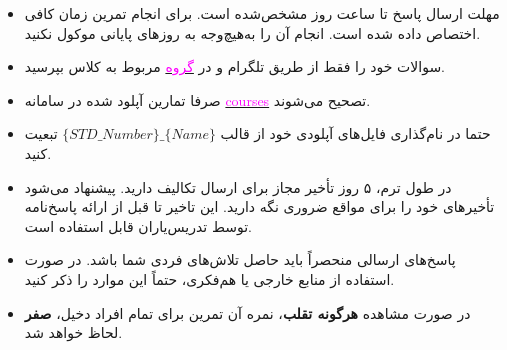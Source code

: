 \begin{itemize}
	\small
	\setlength\itemsep{0.05em}
	\item
	مهلت ارسال پاسخ تا ساعت  روز مشخص‌شده است. ﺑﺮای اﻧﺠﺎم ﺗﻤﺮﯾﻦ زﻣﺎن کافی اختصاص‌ داده ‌شده اﺳﺖ. انجام آن را به‌هیچ‌وجه ﺑﻪ روزﻫﺎی پایانی موکول نکنید.
	\item 
	سوالات خود را فقط از طریق تلگرام و در \href{URL}{\textcolor{magenta}{گروه}} مربوط به کلاس بپرسید.
	
	\item 
	صرفا تمارین آپلود شده در سامانه \href{https://courses.aut.ac.ir/}{\textcolor{magenta}{courses}} تصحیح می‌شوند.
	
	\item 
	حتما در نام‌گذاری فایل‌های آپلودی خود از قالب $\{STD\_Number\}\_\{Name\}$ تبعیت کنید.
	
	\item 
	در طول ترم، ۵ روز تأخیر مجاز برای ارسال تکالیف دارید. پیشنهاد می‌شود تأخیرهای خود را برای مواقع ضروری نگه دارید. این تاخیر تا قبل از ارائه پاسخ‌نامه توسط تدریس‌یاران قابل استفاده است.
	
	\item
	پاسخ‌های ارسالی منحصراً باید حاصل تلاش‌های فردی شما باشد. در صورت استفاده از منابع خارجی یا هم‌فکری، حتماً این موارد را ذکر کنید.
	
	\item 
	در صورت مشاهده \textbf{هرگونه تقلب}، نمره آن تمرین برای تمام افراد دخیل، \textbf{صفر} لحاظ خواهد شد.
\end{itemize}